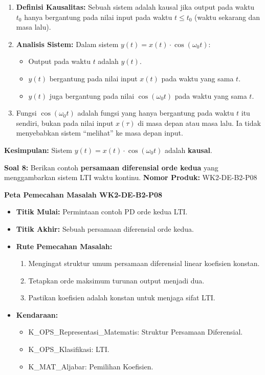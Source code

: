 \documentclass[
  letterpaper,
  DIV=11,
  numbers=noendperiod]{scrreprt}
\providecommand{\tightlist}{%
  \setlength{\itemsep}{0pt}\setlength{\parskip}{0pt}}
\begin{document}
\begin{enumerate}
\def\labelenumi{\arabic{enumi}.}
\tightlist
\item
  \textbf{Definisi Kausalitas:} Sebuah sistem adalah kausal jika output
  pada waktu \(t_0\) hanya bergantung pada nilai input pada waktu
  \(t \le t_0\) (waktu sekarang dan masa lalu).
\item
  \textbf{Analisis Sistem:} Dalam sistem
  \(y(t) = x(t) \cdot \cos(\omega_0 t)\):

  \begin{itemize}
  \tightlist
  \item
    Output pada waktu \(t\) adalah \(y(t)\).
  \item
    \(y(t)\) bergantung pada nilai input \(x(t)\) pada waktu yang sama
    \(t\).
  \item
    \(y(t)\) juga bergantung pada nilai \(\cos(\omega_0 t)\) pada waktu
    yang sama \(t\).
  \end{itemize}
\item
  Fungsi \(\cos(\omega_0 t)\) adalah fungsi yang hanya bergantung pada
  waktu \(t\) itu sendiri, bukan pada nilai input \(x(\tau)\) di masa
  depan atau masa lalu. Ia tidak menyebabkan sistem ``melihat'' ke masa
  depan input.
\end{enumerate}

\textbf{Kesimpulan:} Sistem \(y(t) = x(t) \cdot \cos(\omega_0 t)\)
adalah \textbf{kausal}.

\textbf{Soal 8:} Berikan contoh \textbf{persamaan diferensial orde
kedua} yang menggambarkan sistem LTI waktu kontinu. \textbf{Nomor
Produk:} WK2-DE-B2-P08

\textbf{Peta Pemecahan Masalah WK2-DE-B2-P08}

\begin{itemize}
\tightlist
\item
  \textbf{Titik Mulai:} Permintaan contoh PD orde kedua LTI.
\item
  \textbf{Titik Akhir:} Sebuah persamaan diferensial orde kedua.
\item
  \textbf{Rute Pemecahan Masalah:}

  \begin{enumerate}
  \def\labelenumi{\arabic{enumi}.}
  \tightlist
  \item
    Mengingat struktur umum persamaan diferensial linear koefisien
    konstan.
  \item
    Tetapkan orde maksimum turunan output menjadi dua.
  \item
    Pastikan koefisien adalah konstan untuk menjaga sifat LTI.
  \end{enumerate}
\item
  \textbf{Kendaraan:}

  \begin{itemize}
  \tightlist
  \item
    K\_OPS\_Representasi\_Matematis: Struktur Persamaan Diferensial.
  \item
    K\_OPS\_Klasifikasi: LTI.
  \item
    K\_MAT\_Aljabar: Pemilihan Koefisien.
  \end{itemize}
\end{itemize}
\end{document}
